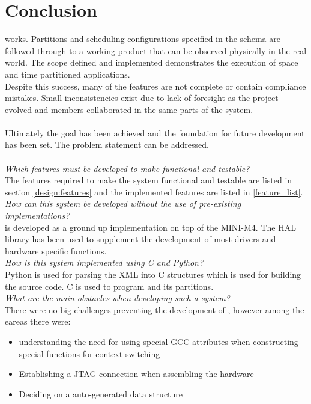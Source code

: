 \chapter{Conclusion}

\OSname{} works. 
Partitions and scheduling configurations specified 
in the schema are followed through to a working 
product that can be observed physically in the real world. 
The scope defined and implemented demonstrates the 
execution of space and time partitioned applications.
\\
Despite this success, many of the features are not 
complete or contain compliance mistakes. 
Small inconsistencies exist due to lack of foresight
as the project evolved and members collaborated 
in the same parts of the system.
\\\\
Ultimately the goal has been achieved and the 
foundation for future development has been set.
The problem statement can be addressed.
\\\\
\textit{Which features must be developed to make \OSname{} functional and
testable?}\\
The features required to make the system functional and testable are listed in  section \ref{design:features}
and the implemented features are listed in \ref{feature_list}.\\

\textit{How can this system be developed without the use of pre-existing
implementations?}\\
\OSname{} is developed as a ground up implementation on top of the MINI-M4.
The HAL library has been used to supplement the development of most drivers and hardware specific functions.\\

\textit{How is this system implemented using C and Python?}\\
Python is used for parsing the XML into C structures which is used for building the source code.
C is used to program \OSname{} and its partitions.\\

\textit{What are the main obstacles when developing such a system?}\\
There were no big challenges preventing the development of \OSname{},
however among the eareas  there were:
\begin{itemize}
	\item understanding the need for using special GCC attributes when constructing special functions for context switching
	\item Establishing a JTAG connection when assembling the hardware
	\item Deciding on a auto-generated data structure
\end{itemize}

